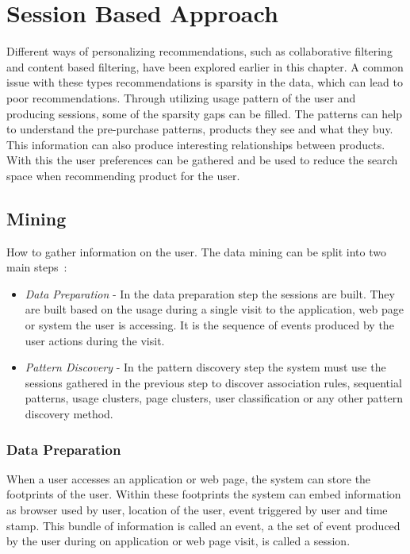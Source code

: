 
\section{Session Based Approach}
    Different ways of personalizing recommendations, such as collaborative filtering and content based filtering, have been explored earlier in this chapter.
    A common issue with these types recommendations is sparsity in the data, which can lead to poor recommendations.
    Through utilizing usage pattern of the user and producing sessions, some of the sparsity gaps can be filled.
    The patterns can help to understand the pre-purchase patterns, products they see and what they buy.
    This information can also produce interesting relationships between products.
    With this the user preferences can be gathered and be used to reduce the search space when recommending product for the user.



\subsection{Mining}
    How to gather information on the user.
    The data mining can be split into two main steps~\cite{Cho2002329}:
    \begin{itemize}
        \item \emph{Data Preparation} - In the data preparation step the sessions are built. They are built based on the usage during a single visit to the application, web page or system the user is accessing. It is the sequence of events produced by the user actions during the visit.
        \item \emph{Pattern Discovery} - In the pattern discovery step the system must use the sessions gathered in the previous step to discover association rules, sequential patterns, usage clusters, page clusters, user classification or any other pattern discovery method.
    \end{itemize}

    \subsubsection{Data Preparation} %
        \label{par:Data_Preparation}
        When a user accesses an application or web page, the system can store the footprints of the user.
        Within these footprints the system can embed information as browser used by user, location of the user, event triggered by user and time stamp.
        This bundle of information is called an event, a the set of event produced by the user during on application or web page visit, is called a session.

